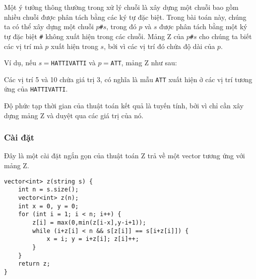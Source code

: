 Một ý tưởng thông thường trong xử lý chuỗi là
xây dựng một chuỗi bao gồm
nhiều chuỗi được phân tách bằng các ký tự đặc biệt.
Trong bài toán này, chúng ta có thể xây dựng một chuỗi
$p$\texttt{\#}$s$,
trong đó $p$ và $s$ được phân tách bằng một ký tự đặc biệt
\texttt{\#} không xuất hiện
trong các chuỗi.
Mảng Z của $p$\texttt{\#}$s$ cho chúng ta biết các vị trí
mà $p$ xuất hiện trong $s$,
bởi vì các vị trí đó chứa độ dài của $p$.

Ví dụ, nếu $s=$\texttt{HATTIVATTI} và $p=$\texttt{ATT},
mảng Z như sau:

\begin{center}
\end{center}

Các vị trí 5 và 10 chứa giá trị 3,
có nghĩa là mẫu \texttt{ATT}
xuất hiện ở các vị trí tương ứng
của \texttt{HATTIVATTI}.

Độ phức tạp thời gian của thuật toán kết quả
là tuyến tính, bởi vì chỉ cần xây dựng
mảng Z và duyệt qua các giá trị của nó.

\subsubsection{Cài đặt}

Đây là một cài đặt ngắn gọn của thuật toán Z
trả về một vector tương ứng với mảng Z.

\begin{lstlisting}
vector<int> z(string s) {
    int n = s.size();
    vector<int> z(n);
    int x = 0, y = 0;
    for (int i = 1; i < n; i++) {
        z[i] = max(0,min(z[i-x],y-i+1));
        while (i+z[i] < n && s[z[i]] == s[i+z[i]]) {
            x = i; y = i+z[i]; z[i]++;
        }
    }
    return z;
}
\end{lstlisting}